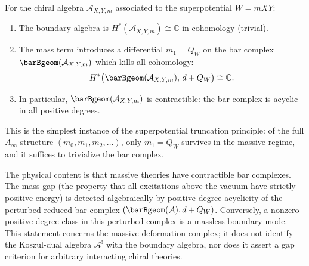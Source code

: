 \begin{proposition}
\label{prop:massive-chiral-contractible}
For the chiral algebra $\mathcal{A}_{X,Y,m}$ associated to the
superpotential $W = mXY$:
\begin{enumerate}[label=\textup{(\roman*)}]
\item The boundary algebra is $H^*(\mathcal{A}_{X,Y,m}) \cong \mathbb{C}$
 in cohomology (trivial).
\item The mass term introduces a differential $m_1 = Q_W$ on the bar
 complex $\barBgeom(\mathcal{A}_{X,Y,m})$ which kills all cohomology:
 \[
 H^*\bigl(\barBgeom(\mathcal{A}_{X,Y,m}),\, d + Q_W\bigr) \cong \mathbb{C}.
 \]
\item In particular, $\barBgeom(\mathcal{A}_{X,Y,m})$ is contractible:
 the bar complex is acyclic in all positive degrees.
\end{enumerate}
\end{proposition}

This is the simplest instance of the superpotential truncation
principle: of the full $A_\infty$ structure $(m_0, m_1, m_2, \ldots)$,
only $m_1 = Q_W$ survives in the massive regime, and it suffices to
trivialize the bar complex.

\begin{remark}
\label{rem:mass-gap-bar-acyclicity}
The physical content is that massive theories have contractible bar
complexes. The mass gap (the property that all excitations above the
vacuum have strictly positive energy) is detected algebraically by
positive-degree acyclicity of the perturbed reduced bar complex
\((\barBgeom(\mathcal A),d+Q_W)\). Conversely, a nonzero
positive-degree class in this perturbed complex is a massless
boundary mode. This statement concerns the massive deformation
complex; it does not identify the Koszul-dual algebra
\(\mathcal A^!\) with the boundary algebra, nor does it assert a
gap criterion for arbitrary interacting chiral theories.
\end{remark}

